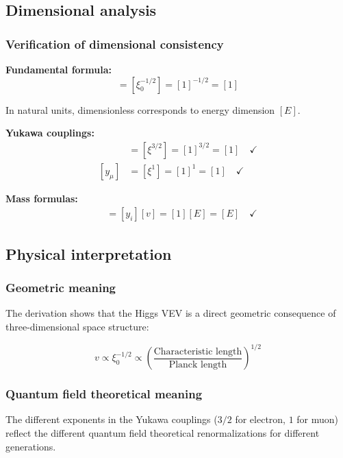 \documentclass[12pt,a4paper]{article}
\begin{document}
\subsection{Dimensional analysis}

\subsubsection{Verification of dimensional consistency}

\textbf{Fundamental formula:}
\begin{equation}
	[v] = [\xi_0^{-1/2}] = [1]^{-1/2} = [1]
\end{equation}

In natural units, dimensionless corresponds to energy dimension $[E]$.

\textbf{Yukawa couplings:}
\begin{align}
	[y_e] &= [\xi^{3/2}] = [1]^{3/2} = [1] \quad \checkmark\\
	[y_\mu] &= [\xi^1] = [1]^1 = [1] \quad \checkmark
\end{align}

\textbf{Mass formulas:}
\begin{align}
	[m_i] &= [y_i][v] = [1][E] = [E] \quad \checkmark
\end{align}

\subsection{Physical interpretation}

\subsubsection{Geometric meaning}

The derivation shows that the Higgs VEV is a direct geometric consequence of three-dimensional space structure:

\begin{equation}
	v \propto \xi_0^{-1/2} \propto \left(\frac{\text{Characteristic length}}{\text{Planck length}}\right)^{1/2}
\end{equation}

\subsubsection{Quantum field theoretical meaning}

The different exponents in the Yukawa couplings ($3/2$ for electron, $1$ for muon) reflect the different quantum field theoretical renormalizations for different generations.
\end{document}
